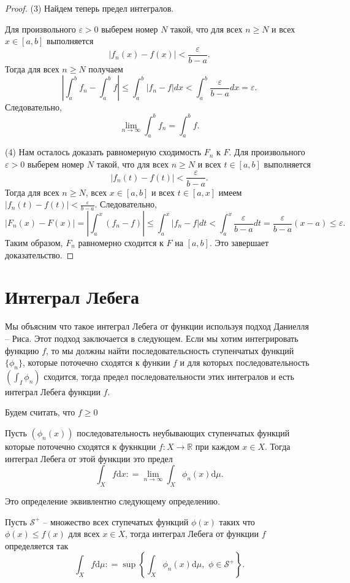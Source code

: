 \begin{proof}
(3) Найдем теперь предел интегралов.

Для произвольного $\varepsilon > 0$ выберем номер $N$ такой, что для всех $n \geq N$ и всех $x \in [a,b]$ выполняется
\[
|f_n(x) - f(x)| < \frac{\varepsilon}{b-a}.
\]
Тогда для всех $n \geq N$ получаем
\[
\left| \int_a^b f_n - \int_a^b f \right| \leq \int_a^b |f_n - f|  dx < \int_a^b \frac{\varepsilon}{b-a}  dx = \varepsilon.
\]
Следовательно, 
\[
\lim_{n\to \infty} \int_a^b f_n = \int_a^b f.
\]

(4) Нам осталось доказать равномерную сходимость $F_n$ к $F$. 
Для произвольного $\varepsilon > 0$ выберем номер $N$ такой, что для всех $n \geq N$ и всех $t \in [a,b]$ выполняется
\[
|f_n(t) - f(t)| < \frac{\varepsilon}{b-a}.
\]
Тогда для всех $n \geq N$, всех $x \in [a,b]$ и всех $t \in [a,x]$ имеем $|f_n(t) - f(t)| < \frac{\varepsilon}{b-a}$. Следовательно,
\[
|F_n(x) - F(x)| = \left| \int_a^x (f_n - f) \right| \leq \int_a^x |f_n - f|  dt < \int_a^x \frac{\varepsilon}{b-a}  dt = \frac{\varepsilon}{b-a} (x - a) \leq \varepsilon.
\]
Таким образом, $F_n$ равномерно сходится к $F$ на $[a,b]$. Это завершает доказательство.

\end{proof}


\section{Интеграл Лебега}

Мы объясним что такое интеграл Лебега от функции используя подход Даниелля -- Риса. Этот подход заключается в следующем. Если мы хотим интегрировать функцию $f$, то мы должны найти последовательсность ступенчатых функций $\{\phi_n\}$, которые поточечно сходятся к функии $f$ и для которых последовательность $(\int_I \phi_n )$ сходится, тогда предел последовательности этих интегралов и есть интеграл Лебега функции $f.$

Будем считать, что $f\ge 0$


\begin{definition}
    Пусть $(\phi_n(x))$ последовательность неубывающих ступенчатых функций которые поточечно сходятся к фукнкции $f:X \to \mathbb{R}$ при каждом $x \in X$. Тогда интеграл Лебега от этой функции это предел
    \[
     \int_X f \mathrm{d}x: = \lim_{n \to \infty} \int_X\phi_n(x) \mathrm{d}\mu.
    \]
\end{definition}

Это определение эквивлентно следующему определению.

\begin{definition}
    Пусть $\mathcal{S}^+$ -- множество всех ступечатых функций $\phi(x)$ таких что $\phi(x) \le f(x)$ для всех $x \in X$, тогда интеграл Лебега от функции $f$ определяется так 
    \[
     \int_Xf\mathrm{d}\mu : = \sup \left\{ \int_X \phi_n(x) \mathrm{d}\mu,\,\, \phi \in \mathcal{S}^+ \right\}.
    \]
\end{definition}


